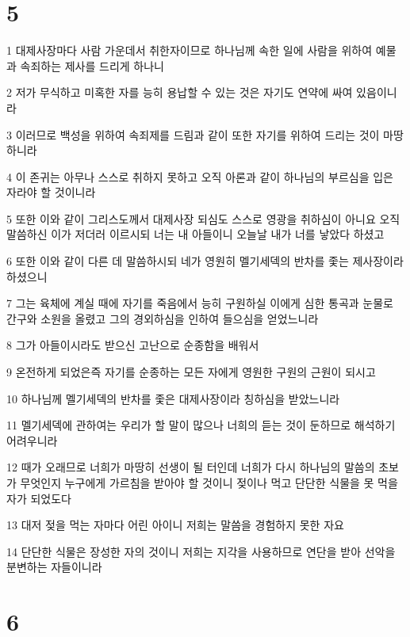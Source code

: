 \chapter{5}

\par 1 대제사장마다 사람 가운데서 취한자이므로 하나님께 속한 일에 사람을 위하여 예물과 속죄하는 제사를 드리게 하나니
\par 2 저가 무식하고 미혹한 자를 능히 용납할 수 있는 것은 자기도 연약에 싸여 있음이니라
\par 3 이러므로 백성을 위하여 속죄제를 드림과 같이 또한 자기를 위하여 드리는 것이 마땅하니라
\par 4 이 존귀는 아무나 스스로 취하지 못하고 오직 아론과 같이 하나님의 부르심을 입은 자라야 할 것이니라
\par 5 또한 이와 같이 그리스도께서 대제사장 되심도 스스로 영광을 취하심이 아니요 오직 말씀하신 이가 저더러 이르시되 너는 내 아들이니 오늘날 내가 너를 낳았다 하셨고
\par 6 또한 이와 같이 다른 데 말씀하시되 네가 영원히 멜기세덱의 반차를 좇는 제사장이라 하셨으니
\par 7 그는 육체에 계실 때에 자기를 죽음에서 능히 구원하실 이에게 심한 통곡과 눈물로 간구와 소원을 올렸고 그의 경외하심을 인하여 들으심을 얻었느니라
\par 8 그가 아들이시라도 받으신 고난으로 순종함을 배워서
\par 9 온전하게 되었은즉 자기를 순종하는 모든 자에게 영원한 구원의 근원이 되시고
\par 10 하나님께 멜기세덱의 반차를 좇은 대제사장이라 칭하심을 받았느니라
\par 11 멜기세덱에 관하여는 우리가 할 말이 많으나 너희의 듣는 것이 둔하므로 해석하기 어려우니라
\par 12 때가 오래므로 너희가 마땅히 선생이 될 터인데 너희가 다시 하나님의 말씀의 초보가 무엇인지 누구에게 가르침을 받아야 할 것이니 젖이나 먹고 단단한 식물을 못 먹을 자가 되었도다
\par 13 대저 젖을 먹는 자마다 어린 아이니 저희는 말씀을 경험하지 못한 자요
\par 14 단단한 식물은 장성한 자의 것이니 저희는 지각을 사용하므로 연단을 받아 선악을 분변하는 자들이니라

\chapter{6}

